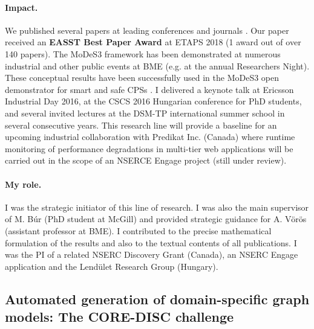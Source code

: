 \paragraph{Impact.} 
We published several papers at leading conferences  \cite{fase2018-cps,nfm2018,models2019-wcet} and journals \cite{sttt-2019-cps}. Our paper \cite{fase2018-cps} received an \textbf{EASST Best Paper Award} at ETAPS 2018 (1 award out of over 140 papers). The MoDeS3 framework has been demonstrated at numerous industrial and other public events at BME (e.g. at the annual Researchers Night). These conceptual results have been successfully used in the MoDeS3 open demonstrator for smart and safe CPSs \cite{nfm2018}. I delivered a keynote talk at Ericsson Industrial Day 2016, at the CSCS 2016 Hungarian conference for PhD students, and several invited lectures at the DSM-TP international summer school in several consecutive years. This research line will provide a baseline for an upcoming industrial collaboration with Predikat Inc. (Canada) where runtime monitoring of performance degradations in multi-tier web applications will be carried out in the scope of an NSERCE Engage project (still under review).

\paragraph{My role.}
I was the strategic initiator of this line of research. I was also the main supervisor of M. Búr (PhD student at McGill) and provided strategic guidance for A. Vörös (assistant professor at BME). I contributed to the precise mathematical formulation of the results \cite{fase2018-cps,sttt-2019-cps,models2019-wcet} and also to the textual contents of all publications. I was the PI of a related NSERC Discovery Grant (Canada), an NSERC Engage application and the Lendület Research Group (Hungary). 

\subsection{Automated generation of domain-specific graph models: The CORE-DISC challenge}
